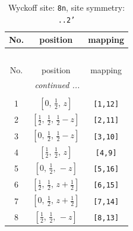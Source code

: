 \documentclass[fleqn,8pt]{jsarticle}
\begin{document}
\begin{longtable}{ccc}
\caption{Wyckoff site: {\tt 8n}, site symmetry: {\tt ..2'}}
 \\
 \hline \hline
No. & position & mapping \\ \hline \endfirsthead

\multicolumn{2}{l}{\tablename\ \thetable{}} \\
 \hline \hline
No. & position & mapping \\ \hline \endhead

 \hline \hline
\multicolumn{2}{r}{\footnotesize\it continued ...} \\ \endfoot

 \hline \hline
\multicolumn{2}{r}{} \\ \endlastfoot

1 & $\left[ 0,\, \frac{1}{2},\, z \right]$ & {\tt [1,12]} \\ \hline
2 & $\left[ \frac{1}{2},\, \frac{1}{2},\, \frac{1}{2} - z \right]$ & {\tt [2,11]} \\ \hline
3 & $\left[ 0,\, \frac{1}{2},\, \frac{1}{2} - z \right]$ & {\tt [3,10]} \\ \hline
4 & $\left[ \frac{1}{2},\, \frac{1}{2},\, z \right]$ & {\tt [4,9]} \\ \hline
5 & $\left[ 0,\, \frac{1}{2},\, - z \right]$ & {\tt [5,16]} \\ \hline
6 & $\left[ \frac{1}{2},\, \frac{1}{2},\, z + \frac{1}{2} \right]$ & {\tt [6,15]} \\ \hline
7 & $\left[ 0,\, \frac{1}{2},\, z + \frac{1}{2} \right]$ & {\tt [7,14]} \\ \hline
8 & $\left[ \frac{1}{2},\, \frac{1}{2},\, - z \right]$ & {\tt [8,13]} \\
\end{longtable}
\renewcommand{\arraystretch}{1.2}
\end{document}
